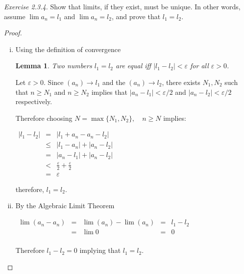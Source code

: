\documentclass{tufte-book}
\newtheorem{lemma}[theorem]{Lemma}
\theoremstyle{definition}
\numberwithin{section}{chapter}
\begin{document}
\smallskip


\noindent
\emph{Exercise 2.3.4.}  Show that limits, if they exist, must be unique. In other words, assume $\lim a_n = l_1$ and $\lim a_n = l_2$, and prove that $l_1 = l_2$.
\begin{proof}
\begin{enumerate}[(i)]
	\item    Using the definition of convergence
	\noindent {}\begin{lemma}  Two numbers $l_1 = l_2 $ are equal iff $|l_1 - l_2 |< \varepsilon$ for all $\varepsilon > 0$.
		\end{lemma} 
	
	Let $\varepsilon > 0$.  Since $(a_n) \to l_1$ and the $(a_n) \to l_2$, there exists $N_1, N_2$ such that $n \geq N_1$ and $n \geq N_2$ implies that $|a_n - l_1| < \varepsilon/2$ and $|a_n - l_2| < \varepsilon/2$  respectively.
	
	Therefore choosing $N = \max\{N_1, N_2\}, \quad n \geq N$ implies:


$\begin{array} {lcl} 
|l_1 - l_2|& = &|l_1 + a_n - a_n - l_2 | \\ 
	& \leq & |l_1 - a_n | +  |a_n - l_2 |\\
	& = & |a_n - l_1 | + |a_n - l_2 |\\
	& < & \frac{\varepsilon}{2} + \frac{\varepsilon}{2} \\
	&=& \varepsilon
    \end{array}$	 
    
    therefore, $l_1 = l_2$.

	\item  By the Algebraic Limit Theorem
	
	$\begin{array} {lclcl} 
\lim (a_n - a_n)& = &\lim (a_n) -\lim (a_n)  &=& l_{1} - l_{2}\\ 
			& = &\lim 0 			&=& 0 \\
    \end{array}	$
    
    Therefore $l_1 - l_2 = 0$ implying that $l_1 = l_2$.
	
\end{enumerate}
\end{proof}
\end{document}
